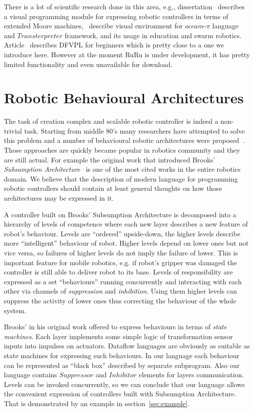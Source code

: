 \documentclass[conference,compsoc]{IEEEtran}
\begin{document}
There is a lot of scientific research done in this area, e.g., dissertation~\cite{banyasad2000visual} describes a visual programming module for expressing robotic controllers in terms of extended Moore machines,~\cite{simpson2008visual, posso2011process} describe visual environment for $occam\mbox{-}\pi$ language and $Transterpreter$ framework, and its usage in education and swarm robotics. Article~\cite{diprose2011ruru} describes DFVPL for beginners which is pretty close to a one we introduce here. However at the moment RuRu is under development, it has pretty limited functionality and even unavailable for download.

\section{Robotic Behavioural Architectures}
\label{sec:Architectures}

The task of creation complex and scalable robotic controller is indeed a non-trivial task. Starting from middle 80's many researchers have attempted to solve this problem and a number of behavioural robotic architectures were proposed~\cite{simpson2009toward}. Those approaches are quickly became popular in robotics community and they are still actual. For example the original work that introduced Brooks' \textit{Subsumption Architecture}~\cite{brooks1986robust} is one of the most cited works in the entire robotics domain. We believe that the description of modern language for programming robotic controllers should contain at least general thoughts on how those architectures may be expressed in it.

A controller built on Brooks' Subsumption Architecture is decomposed into a hierarchy of levels of competence where each new layer describes a new feature of robot's behaviour. Levels are ``ordered'' upside-down, the higher levels describe more ``intelligent''  behaviour of robot. Higher levels depend on lower ones but not vice versa, so failures of higher levels do not imply the failure of lower. This is important feature for mobile robotics, e.g. if robot's gripper was damaged the controller is still able to deliver robot to its base. Levels of responsibility are expressed as a set ``behaviours'' running concurrently and interacting with each other via channels of \textit{suppression} and \textit{inhibition}. Using them higher levels can suppress the activity of lower ones thus correcting the behaviour of the whole system.

Brooks' in his original work offered to express behaviours in terms of \textit{state machines}. Each layer implements some simple logic of transformation sensor inputs into impulses on actuators. Dataflow languages are obviously as suitable as state machines for expressing such behaviours. In our language each behaviour can be represented as ``black box'' described by separate subprogram. Also our language contains $Suppressor$ and $Inhibitor$ elements for layers communication. Levels can be invoked concurrently, so we can conclude that our language allows the convenient expression of controllers built with Subsumption Architecture. That is demonstrated by an example in section~\ref{sec:example}.
\end{document}
